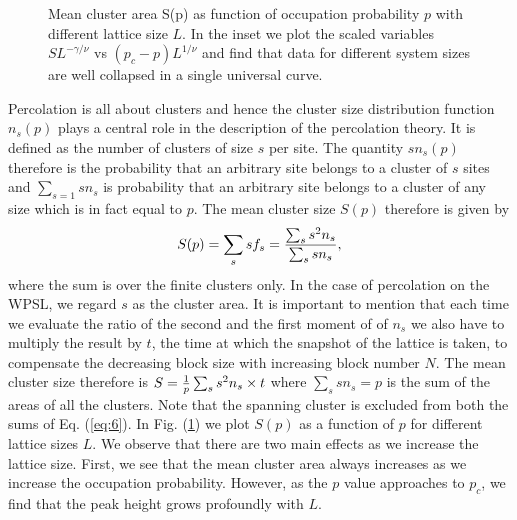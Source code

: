 \documentclass[twocolumn,showpacs,preprintnumbers,amsmath,amssymb]{article}
\begin{document}
\begin{figure}

\caption{Mean cluster area S(p) as function of occupation probability $p$ with different lattice size $L$. In the
inset we plot the scaled variables $SL^{-\gamma/\nu}$ vs $(p_c-p)L^{1/\nu}$ and find that data for different system sizes are
well collapsed in a single universal curve.
\label{fig4}
}
\end{figure}


Percolation is all about clusters and hence the cluster size distribution function $n_s(p)$ plays a central
role in the description of the percolation theory.  It is defined as the number of clusters of size $s$ per site.
The quantity $sn_s(p)$ therefore is the probability that an arbitrary site belongs to a cluster of $s$ sites 
and $\sum_{s=1} sn_s$ is probability that an arbitrary site belongs to a cluster of any size which is in fact equal to
$p$.
The mean cluster size $S(p)$ therefore is given by
\begin{equation}
\label{eq:6}
S(p)=\sum_s sf_s={{\sum_s s^2n_s}\over{\sum_s sn_s}},
\end{equation}
where the sum is over the finite clusters only. In the case of percolation on the WPSL, we regard $s$ as
the cluster area. It is important to mention that each time we evaluate the ratio of the second and the first moment of
of $n_s$ we also have to multiply the result by $t$, the time at which the snapshot of the lattice is taken, to compensate the decreasing block size with increasing block number $N$. 
The mean cluster size therefore is
$S={{1}\over{p}}\sum_s s^2n_s \times t$ where $\sum_s sn_s=p$ is the sum of the areas of all the clusters. Note that the spanning cluster is excluded 
from both the sums of Eq. (\ref{eq:6}). 
In Fig. (\ref{fig4}) we plot $S(p)$ as a function of $p$ for different lattice sizes $L$. We observe that there are two main effects as we
increase the lattice size. First, we see that the mean cluster area
always increases as we increase the occupation probability. However, as the $p$ value approaches to $p_c$, we find
that the peak height grows profoundly with $L$. 
\end{document}

